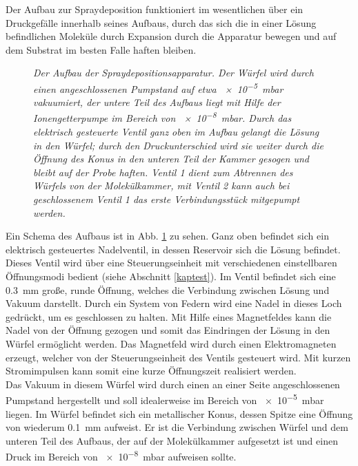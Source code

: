 Der Aufbau zur Spraydeposition funktioniert im wesentlichen über ein Druckgefälle innerhalb seines
Aufbaus, durch das sich die in einer Lösung befindlichen Moleküle durch Expansion durch die
Apparatur bewegen und auf dem Substrat im besten Falle haften bleiben. 
\\
\begin{figure}
\centering
\sffamily

\caption{\textit{Der Aufbau der Spraydepositionsapparatur.
Der Würfel wird durch einen angeschlossenen Pumpstand auf etwa \SI{e-5}{mbar} vakuumiert, der untere
Teil des Aufbaus liegt mit Hilfe der Ionengetterpumpe im Bereich von \SI{e-8}{mbar}. Durch das
elektrisch gesteuerte Ventil ganz oben im Aufbau gelangt die Lösung in den Würfel; durch den
Druckunterschied wird sie weiter durch die Öffnung des Konus in den unteren Teil der Kammer gesogen
und bleibt auf der Probe haften. Ventil 1 dient zum Abtrennen des Würfels von der Molekülkammer, mit
Ventil 2 kann auch bei geschlossenem Ventil 1 das erste Verbindungsstück mitgepumpt werden.
}}
\label{sbaufbau}
\end{figure}
Ein Schema des Aufbaus ist in Abb. \ref{sbaufbau} zu sehen. Ganz oben befindet sich ein elektrisch
gesteuertes Nadelventil, in dessen Reservoir sich die Lösung befindet. Dieses Ventil wird über eine
Steuerungseinheit mit verschiedenen einstellbaren Öffnungsmodi bedient (siehe Abschnitt \ref{kaptest}). 
Im Ventil befindet sich eine \SI{0,3}{mm} große, runde Öffnung, welches die Verbindung zwischen
Lösung und Vakuum darstellt. Durch ein System von Federn wird eine Nadel in dieses Loch gedrückt, um
es geschlossen zu halten.
Mit Hilfe eines Magnetfeldes kann die Nadel von der Öffnung gezogen und somit das Eindringen der
Lösung in den Würfel ermöglicht werden. 
Das Magnetfeld wird durch einen Elektromagneten erzeugt, welcher von der Steuerungseinheit des
Ventils gesteuert wird. Mit kurzen Stromimpulsen kann somit eine kurze Öffnungszeit realisiert
werden.
\\
Das Vakuum in diesem Würfel wird durch einen an einer Seite angeschlossenen Pumpstand hergestellt
und soll idealerweise im Bereich von \SI{e-5}{mbar} liegen. Im Würfel befindet sich ein metallischer
Konus, dessen Spitze eine Öffnung von wiederum \SI{0,1}{mm} aufweist. Er ist die Verbindung zwischen
Würfel und dem unteren Teil des Aufbaus, der auf der Molekülkammer aufgesetzt ist und einen Druck im Bereich von
\SI{e-8}{mbar} aufweisen sollte.  

